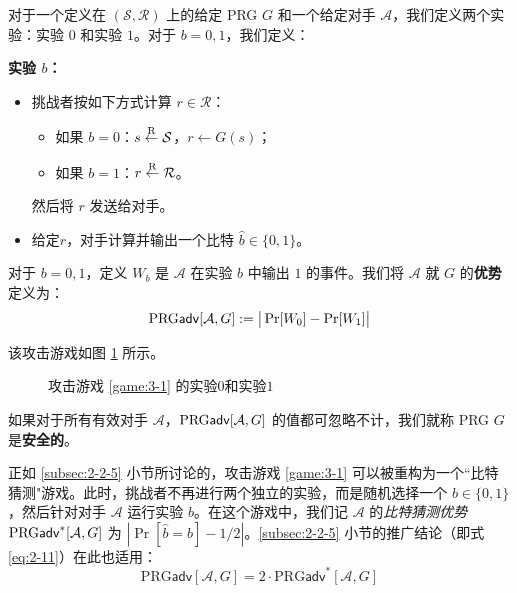 \begin{game}[伪随机生成器]\label{game:3-1}
对于一个定义在 $(\mathcal{S},\mathcal{R})$ 上的给定 PRG $G$ 和一个给定对手 $\mathcal{A}$，我们定义两个实验：实验 $0$ 和实验 $1$。对于 $b=0,1$，我们定义：

\vspace{5pt}

\noindent\textbf{实验 $b$：}
\begin{itemize}
	\item 挑战者按如下方式计算 $r\in\mathcal{R}$：
	\begin{itemize}
		\item 如果 $b=0$：$s\overset{\rm R}\leftarrow\mathcal{S}$，$r\leftarrow G(s)$；
		\item 如果 $b=1$：$r\overset{\rm R}\leftarrow\mathcal{R}$。
	\end{itemize}
	然后将 $r$ 发送给对手。
	\item 给定$r$，对手计算并输出一个比特 $\hat{b}\in\{0,1\}$。
\end{itemize}

对于 $b=0,1$，定义 $W_b$ 是 $\mathcal{A}$ 在实验 $b$ 中输出 $1$ 的事件。我们将 $\mathcal{A}$ 就 $G$ 的\textbf{优势}定义为：
\[
{\rm PRG\mathsf{adv}}[\mathcal{A},G]
:=
\big\lvert
\Pr[W_0]-\Pr[W_1]
\big\rvert
\]
\end{game}

该攻击游戏如图 \ref{fig:3-1} 所示。

\begin{figure}
	\centering
	
	\caption{攻击游戏 \ref{game:3-1} 的实验$0$和实验$1$}
	\label{fig:3-1}
\end{figure}

\begin{definition}\label{def:3-1}
如果对于所有有效对手 $\mathcal{A}$，${\rm PRG\mathsf{adv}}[\mathcal{A},G]$ 的值都可忽略不计，我们就称 PRG $G$ 是\textbf{安全的}。

\end{definition}

正如 \ref{subsec:2-2-5} 小节所讨论的，攻击游戏 \ref{game:3-1} 可以被重构为一个``比特猜测"游戏。此时，挑战者不再进行两个独立的实验，而是随机选择一个 $b\in\{0,1\}$，然后针对对手 $\mathcal{A}$ 运行实验 $b$。在这个游戏中，我们记 $\mathcal{A}$ 的\emph{比特猜测优势} ${\rm PRG\mathsf{adv}}^*[\mathcal{A},G]$ 为 $|\Pr[\hat{b}=b]-1/2|$。\ref{subsec:2-2-5} 小节的推广结论（即式 \ref{eq:2-11}）在此也适用：
\begin{equation}
\mathrm{PRG}\mathsf{adv}[\mathcal{A},G]
=2\cdot
\mathrm{PRG}\mathsf{adv}^*[\mathcal{A},G]
\end{equation}

